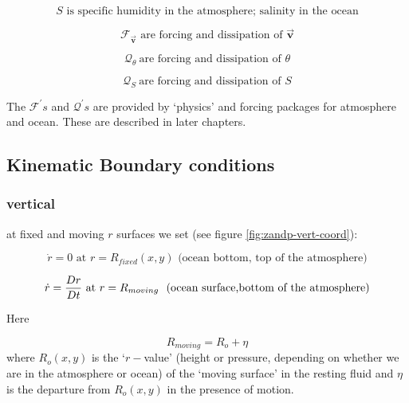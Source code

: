 \begin{equation*}
S\text{ is specific humidity in the atmosphere; salinity in the ocean}
\end{equation*}

\begin{equation*}
\mathcal{F}_{\vec{\mathbf{v}}}\text{ are forcing and dissipation of }\vec{
\mathbf{v}}
\end{equation*}

\begin{equation*}
\mathcal{Q}_{\theta }\mathcal{\ }\text{are forcing and dissipation of }\theta
\end{equation*}

\begin{equation*}
\mathcal{Q}_{S}\mathcal{\ }\text{are forcing and dissipation of }S
\end{equation*}

The $\mathcal{F}^{\prime }s$ and $\mathcal{Q}^{\prime }s$ are provided by
`physics' and forcing packages for atmosphere and ocean. These are described
in later chapters.

\subsection{Kinematic Boundary conditions}

\subsubsection{vertical}

at fixed and moving $r$ surfaces we set (see figure \ref{fig:zandp-vert-coord}):

\begin{equation}
\dot{r}=0 \text{\ at\ } r=R_{fixed}(x,y)\text{ (ocean bottom, top of the atmosphere)}
\label{eq:fixedbc}
\end{equation}

\begin{equation}
\dot{r}=\frac{Dr}{Dt} \text{\ at\ } r=R_{moving}\text{ \
(ocean surface,bottom of the atmosphere)}  \label{eq:movingbc}
\end{equation}

Here

\begin{equation*}
R_{moving}=R_{o}+\eta
\end{equation*}
where $R_{o}(x,y)$ is the `$r-$value' (height or pressure, depending on
whether we are in the atmosphere or ocean) of the `moving surface' in the
resting fluid and $\eta $ is the departure from $R_{o}(x,y)$ in the presence
of motion.

